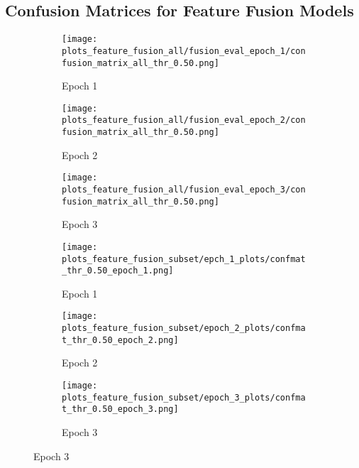 \subsection{Confusion Matrices for Feature Fusion Models}


\begin{figure}[H]
  \centering

  \begin{subfigure}[t]{0.32\textwidth}
    \centering
    \texttt{[image: plots\_feature\_fusion\_all/fusion\_eval\_epoch\_1/confusion\_matrix\_all\_thr\_0.50.png]}
    \caption{Epoch 1}
    \label{fig:ff_all_e1}
  \end{subfigure}\hfill
  \begin{subfigure}[t]{0.32\textwidth}
    \centering
    \texttt{[image: plots\_feature\_fusion\_all/fusion\_eval\_epoch\_2/confusion\_matrix\_all\_thr\_0.50.png]}
    \caption{Epoch 2}
    \label{fig:ff_all_e2}
  \end{subfigure}\hfill
  \begin{subfigure}[t]{0.32\textwidth}
    \centering
    \texttt{[image: plots\_feature\_fusion\_all/fusion\_eval\_epoch\_3/confusion\_matrix\_all\_thr\_0.50.png]}
    \caption{Epoch 3}
    \label{fig:ff_all_e3}
  \end{subfigure}

  \vspace{0.45cm}

  \begin{subfigure}[t]{0.32\textwidth}
    \centering
    \texttt{[image: plots\_feature\_fusion\_subset/epch\_1\_plots/confmat\_thr\_0.50\_epoch\_1.png]}
    \caption{Epoch 1}
    \label{fig:ff_psy_e1}
  \end{subfigure}\hfill
  \begin{subfigure}[t]{0.32\textwidth}
    \centering
    \texttt{[image: plots\_feature\_fusion\_subset/epoch\_2\_plots/confmat\_thr\_0.50\_epoch\_2.png]}
    \caption{Epoch 2}
    \label{fig:ff_psy_e2}
  \end{subfigure}\hfill
  \begin{subfigure}[t]{0.32\textwidth}
    \centering
    \texttt{[image: plots\_feature\_fusion\_subset/epoch\_3\_plots/confmat\_thr\_0.50\_epoch\_3.png]}
    \caption{Epoch 3}
    \label{fig:ff_psy_e3}
  \end{subfigure}


\end{figure}

